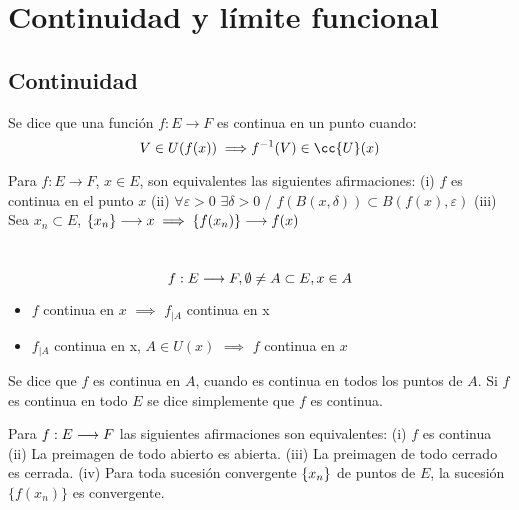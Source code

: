 \chapter{Continuidad y límite funcional}
\section{Continuidad}

\begin{definicion}
    Se dice que una función $f:E \longrightarrow F$ es continua en un punto cuando:
    $$V \in U(f(x)) \\ \implies \\ f^{-1}(V) \in \cc{U}(x)$$
\end{definicion}

\begin{prop}[Caracterizacion]
    Para $f:E \longrightarrow F$, $x\in E$, son equivalentes las siguientes afirmaciones:\newline
    (i)  $f$ es continua en el punto $x$\newline
    (ii)  $\forall \varepsilon > 0$  $\exists \delta > 0$  / $f(B(x,\delta)) \subset B(f(x), \varepsilon)$\newline
    (iii)  Sea ${x_n} \subset E$, $\{x_n\} \longrightarrow x  \implies \{f(x_n)\} \longrightarrow f(x)$
\end{prop}

\begin{prop}\\
    $$f:E \longrightarrow F, \\ \emptyset \neq A \subset E, \\ x \in A$$
    \begin{itemize}
        \item $f$ continua en $x$ $\implies$ $f_{|A}$ continua en x
        \item $f_{|A}$ continua en x, $A \in U(x)$ $\implies$ $f$ continua en $x$
    \end{itemize}
\end{prop}

\begin{definicion}
    Se dice que $f$ es continua en $A$, cuando es continua en todos los puntos de $A$. Si $f$ es continua en todo $E$ se dice simplemente que $f$ es continua.
\end{definicion}

\begin{prop}[Caracterización]
    Para $f:E \longrightarrow F$ las siguientes afirmaciones son equivalentes:\newline
    (i)  $f$ es continua \newline
    (ii)  La preimagen de todo abierto es abierta. \newline
    (iii)  La preimagen de todo cerrado es cerrada. \newline
    (iv)  Para toda sucesión convergente $\{x_n\}$ de puntos de $E$, la sucesión $\{f(x_n)\}$ es convergente.
\end{prop}

